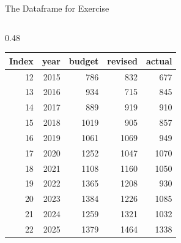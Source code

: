\documentclass[aspectratio=169,11pt]{beamer}
\begin{document}
\begin{frame}{The Dataframe for Exercise}
\begin{columns}[T]
\begin{column}{0.48\textwidth}
					\begin{tabular}{rrrrr}
						\toprule
						Index & year & budget & revised & actual \\
						\midrule
						12 & 2015 & 786  & 832  & 677  \\
						13 & 2016 & 934  & 715  & 845  \\
						14 & 2017 & 889  & 919  & 910  \\
						15 & 2018 & 1019 & 905  & 857  \\
						16 & 2019 & 1061 & 1069 & 949  \\
						17 & 2020 & 1252 & 1047 & 1070 \\
						18 & 2021 & 1108 & 1160 & 1050 \\
						19 & 2022 & 1365 & 1208 & 930  \\
						20 & 2023 & 1384 & 1226 & 1085 \\
						21 & 2024 & 1259 & 1321 & 1032 \\
						22 & 2025 & 1379 & 1464 & 1338 \\
						\bottomrule
					\end{tabular}
					
				\end{column}
				
			\end{columns}
		
	\end{frame}
	
	
	
\end{document}
